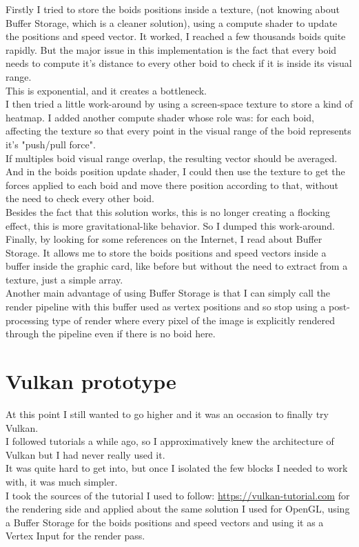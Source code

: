 \documentclass{article}
\begin{document}
Firstly I tried to store the boids positions inside a texture, (not knowing about Buffer Storage, which is a cleaner solution), using a compute shader to update the positions and speed vector. It worked, I reached a few thousands boids quite rapidly. But the major issue in this implementation is the fact that every boid needs to compute it's distance to every other boid to check if it is inside its visual range.\\
This is exponential, and it creates a bottleneck.\\
I then tried a little work-around by using a screen-space texture to store a kind of heatmap. I added another compute shader whose role was: for each boid, affecting the texture so that every point in the visual range of the boid represents it's "push/pull force".\\
If multiples boid visual range overlap, the resulting vector should be averaged.\\
And in the boids position update shader, I could then use the texture to get the forces applied to each boid and move there position according to that, without the need to check every other boid.\\
Besides the fact that this solution works, this is no longer creating a flocking effect, this is more gravitational-like behavior. So I dumped this work-around.\\

Finally, by looking for some references on the Internet, I read about Buffer Storage. It allows me to store the boids positions and speed vectors inside a buffer inside the graphic card, like before but without the need to extract from a texture, just a simple array.\\
Another main advantage of using Buffer Storage is that I can simply call the render pipeline with this buffer used as vertex positions and so stop using a post-processing type of render where every pixel of the image is explicitly rendered through the pipeline even if there is no boid here.\\

\section{Vulkan prototype}
At this point I still wanted to go higher and it was an occasion to finally try Vulkan.\\
I followed tutorials a while ago, so I approximatively knew the architecture of Vulkan but I had never really used it.\\
It was quite hard to get into, but once I isolated the few blocks I needed to work with, it was much simpler.\\
I took the sources of the tutorial I used to follow: \url{https://vulkan-tutorial.com} for the rendering side and applied about the same solution I used for OpenGL, using a Buffer Storage for the boids positions and speed vectors and using it as a Vertex Input for the render pass.\\
\end{document}
